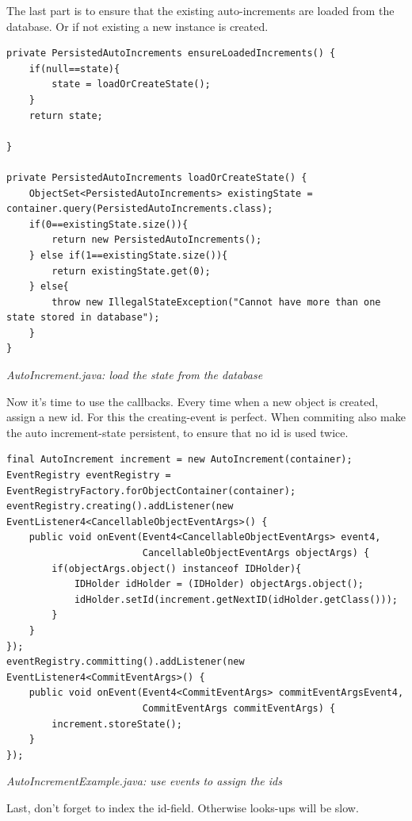 The last part is to ensure that the existing auto-increments are loaded from the database. Or if not existing a new instance is created.

\begin{lstlisting}
private PersistedAutoIncrements ensureLoadedIncrements() {
    if(null==state){
        state = loadOrCreateState();
    }
    return state;

}

private PersistedAutoIncrements loadOrCreateState() {
    ObjectSet<PersistedAutoIncrements> existingState = container.query(PersistedAutoIncrements.class);
    if(0==existingState.size()){
        return new PersistedAutoIncrements(); 
    } else if(1==existingState.size()){
        return existingState.get(0);
    } else{
        throw new IllegalStateException("Cannot have more than one state stored in database");
    }
}
\end{lstlisting}

{\small\itshape AutoIncrement.java: load the state from the database\par}
\medskip

Now it's time to use the callbacks. Every time when a new object is created, assign a new id. For this the creating-event is perfect. When commiting also make the auto increment-state persistent, to ensure that no id is used twice.

\begin{lstlisting}
final AutoIncrement increment = new AutoIncrement(container);
EventRegistry eventRegistry = EventRegistryFactory.forObjectContainer(container);
eventRegistry.creating().addListener(new EventListener4<CancellableObjectEventArgs>() {
    public void onEvent(Event4<CancellableObjectEventArgs> event4,
                        CancellableObjectEventArgs objectArgs) {
        if(objectArgs.object() instanceof IDHolder){
            IDHolder idHolder = (IDHolder) objectArgs.object();
            idHolder.setId(increment.getNextID(idHolder.getClass()));
        }
    }
});
eventRegistry.committing().addListener(new EventListener4<CommitEventArgs>() {
    public void onEvent(Event4<CommitEventArgs> commitEventArgsEvent4,
                        CommitEventArgs commitEventArgs) {
        increment.storeState();
    }
});
\end{lstlisting}

{\small\itshape AutoIncrementExample.java: use events to assign the ids\par}
\medskip

Last, don't forget to index the id-field. Otherwise looks-ups will be slow.


